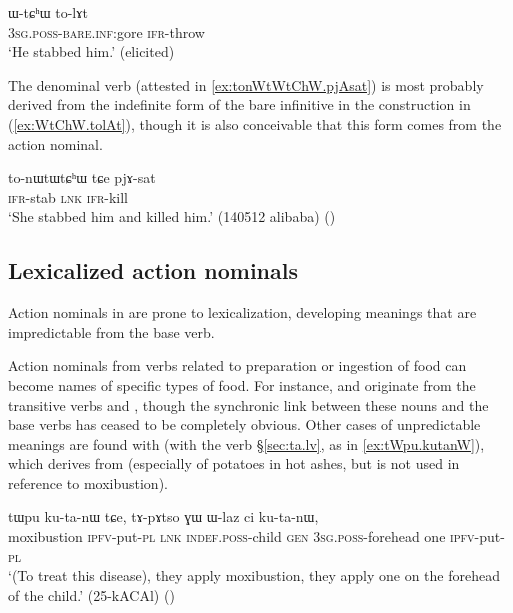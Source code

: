 \begin{exe}
\ex \label{ex:WtChW.tolAt}
\gll  ɯ-tɕʰɯ to-lɤt \\
\textsc{3sg}.\textsc{poss}-\textsc{bare}.\textsc{inf}:gore \textsc{ifr}-throw \\
\glt `He stabbed him.' (elicited)
\end{exe}

The denominal verb  (attested in \ref{ex:tonWtWtChW.pjAsat}) is most probably derived from the indefinite form  of the bare infinitive in the construction in (\ref{ex:WtChW.tolAt}), though it is also conceivable that this form comes from the action nominal.

\begin{exe}
\ex \label{ex:tonWtWtChW.pjAsat}
\gll  to-nɯtɯtɕʰɯ tɕe pjɤ-sat \\
\textsc{ifr}-stab \textsc{lnk} \textsc{ifr}-kill \\
\glt `She stabbed him and killed him.' (140512 alibaba) ()
\end{exe}

\subsection{Lexicalized action nominals}  \label{sec:lexicalized.action.nominals}
Action nominals in  are prone to lexicalization, developing meanings that are impredictable from the base verb.

Action nominals from verbs related to preparation or ingestion of food can become names of specific types of food. For instance,  and  originate from the transitive verbs  and , though the synchronic link between these nouns and the base verbs has ceased to be completely obvious. Other cases of unpredictable meanings are found with  (with the verb  §\ref{sec:ta.lv}, as in \ref{ex:tWpu.kutanW}), which derives from  (especially of potatoes in hot ashes, but is not used in reference to moxibustion).

\begin{exe}
\ex \label{ex:tWpu.kutanW}
\gll tɯpu ku-ta-nɯ tɕe, tɤ-pɤtso ɣɯ ɯ-laz ci ku-ta-nɯ, \\
moxibustion \textsc{ipfv}-put-\textsc{pl} \textsc{lnk} \textsc{indef}.\textsc{poss}-child \textsc{gen} \textsc{3sg}.\textsc{poss}-forehead one \textsc{ipfv}-put-\textsc{pl} \\
\glt `(To treat this disease), they apply moxibustion, they apply one on the forehead of the child.' (25-kACAl)	()
\end{exe}


